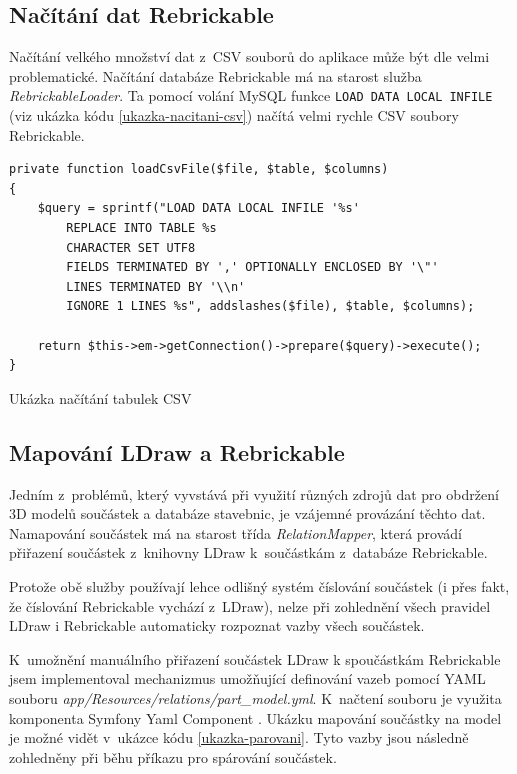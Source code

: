 \subsection{Načítání dat Rebrickable}\label{nacitani-rebrickable}
Načítání velkého množství dat z~CSV souborů do aplikace může být dle \autocite{grok} velmi problematické. Načítání databáze Rebrickable má na starost služba \textit{RebrickableLoader}. Ta pomocí volání MySQL funkce \texttt{LOAD DATA LOCAL INFILE} (viz ukázka kódu \ref{ukazka-nacitani-csv}) načítá velmi rychle CSV soubory Rebrickable.

\begin{listing}[htbp]
        \begin{verbatim}
private function loadCsvFile($file, $table, $columns)
{
    $query = sprintf("LOAD DATA LOCAL INFILE '%s' 
        REPLACE INTO TABLE %s
        CHARACTER SET UTF8
        FIELDS TERMINATED BY ',' OPTIONALLY ENCLOSED BY '\"'
        LINES TERMINATED BY '\\n'
        IGNORE 1 LINES %s", addslashes($file), $table, $columns);

    return $this->em->getConnection()->prepare($query)->execute();
}
        \end{verbatim}
    \caption{Ukázka načítání tabulek CSV \label{ukazka-nacitani-csv}}
\end{listing}

\subsection{Mapování LDraw a Rebrickable}
Jedním z~problémů, který vyvstává při využití různých zdrojů dat pro obdržení 3D modelů součástek a databáze stavebnic, je vzájemné provázání těchto dat. Namapování součástek má na starost třída \textit{RelationMapper}, která provádí přiřazení součástek z~knihovny LDraw k~součástkám z~databáze Rebrickable. 

Protože obě služby používají lehce odlišný systém číslování součástek (i přes fakt, že číslování Rebrickable vychází z~LDraw), nelze při zohlednění všech pravidel LDraw \autocite{ldraw:numbering:faq} i Rebrickable \autocite{rebrickable:numbering:changes} automaticky rozpoznat vazby všech součástek.

K~umožnění manuálního přiřazení součástek LDraw k spoučástkám Rebrickable jsem implementoval mechanizmus umožňující definování vazeb pomocí \gls{YAML} souboru \textit{app/Resources/relations/part\_model.yml}. K~načtení souboru je využita komponenta Symfony Yaml Component \autocite{symfony:yaml}. Ukázku mapování součástky na model je možné vidět v~ukázce kódu \ref{ukazka-parovani}. Tyto vazby jsou následně zohledněny při běhu příkazu pro spárování součástek.

